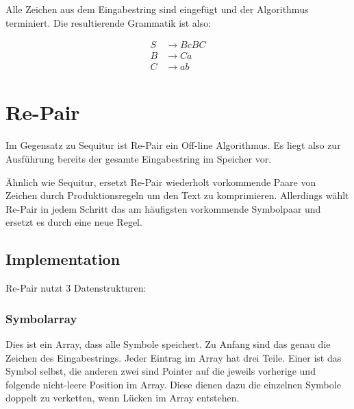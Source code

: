 Alle Zeichen aus dem Eingabestring sind eingefügt und der Algorithmus terminiert. Die resultierende Grammatik ist also:

\begin{align*}
	S &\rightarrow BcBC\\
	B &\rightarrow Ca\\
	C &\rightarrow ab
\end{align*}


\section{Re-Pair}

Im Gegensatz zu Sequitur ist Re-Pair\cite{larsson_off-line_2000} ein Off-line Algorithmus. Es liegt also zur Ausführung bereits der gesamte Eingabestring im Speicher vor.

Ähnlich wie Sequitur, ersetzt Re-Pair wiederholt vorkommende Paare von Zeichen durch Produktionsregeln um den Text zu komprimieren. Allerdings wählt Re-Pair in jedem Schritt das am häufigsten vorkommende Symbolpaar und ersetzt es durch eine neue Regel.

\subsection{Implementation}

Re-Pair nutzt 3 Datenstrukturen:

\subsubsection{Symbolarray}

Dies ist ein Array, dass alle Symbole speichert. Zu Anfang sind das genau die Zeichen des Eingabestrings. Jeder Eintrag im Array hat drei Teile. Einer ist das Symbol selbst, die anderen zwei sind Pointer auf die jeweils vorherige und folgende nicht-leere Position im Array. Diese dienen dazu die einzelnen Symbole doppelt zu verketten, wenn Lücken im Array entstehen.

